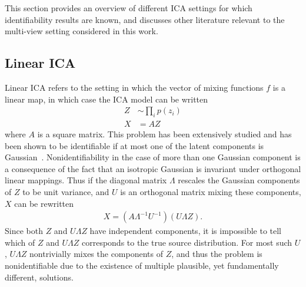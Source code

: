 This section provides an overview of different ICA settings for which identifiability results are known, and discusses other literature relevant to the multi-view setting considered in this work.





\subsection{Linear ICA}\label{subsec:ica-literature-linear-ica}


Linear ICA refers to the setting in which the vector of mixing functions $f$ is a linear map, 
in which case the ICA model can be written
%
\begin{align*}
Z &\sim \prod_i p(z_i) \\
X &= AZ
\end{align*}
%
where $A$ is a square matrix.
This problem has been extensively studied and has been shown to be identifiable if at most one of the latent components is Gaussian~\citep{darmois1953analyse, skitovich1954linear, comon1994independent}.
Nonidentifiability in the case of more than one Gaussian component is a consequence of the fact that an isotropic Gaussian is invariant under orthogonal linear mappings.
Thus if the diagonal matrix $\Lambda$ rescales the Gaussian components of $Z$ to be unit variance, and $U$ is an orthogonal matrix mixing these components, $X$ can be rewritten
%
\begin{align*}
X = \left(A\Lambda^{-1}U^{-1} \right) \left(U\Lambda Z\right).
\end{align*}
%
Since both $Z$ and $U\Lambda Z$ have independent components, it is impossible to tell which of $Z$ and ${U}{\Lambda} Z$ corresponds to the true source distribution.
For most such $U$, $U\Lambda Z$ nontrivially mixes the components of $Z$, and thus the problem is nonidentifiable due to the existence of multiple plausible, yet fundamentally different, solutions.

